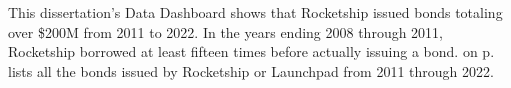 \begin{itemize}
\begin{comment}
  For example, in 2014, the California Municipal Finance Authority issued bonds (2014A:tax-exempt and 2014B:taxable) for \$32,915,000. These bonds were bought by Approved Institutional Buyers, and the proceeds were loaned to Launchpad Development Company which used them for public benefit. The borrower is Launchpad Development Company, and the conduit borrower is the California Municipal Finance Authority.
\end{comment}
\end{itemize}

This dissertation's Data Dashboard shows that Rocketship issued bonds totaling over \$200M from 2011 to 2022. In the years ending 2008 through 2011, Rocketship borrowed at least fifteen times before actually issuing a bond.  on p.\pageref{tab:rocketship_bonds} lists all the bonds issued by Rocketship or Launchpad from 2011 through 2022.

